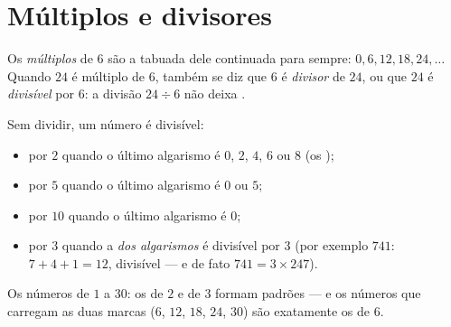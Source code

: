\section{Múltiplos e divisores}

\begin{definition}\label{def:g5:division:multiple}
Os \emph{múltiplos} de $6$ são a tabuada dele
continuada para sempre: $0, 6, 12, 18, 24, \dots$ Quando $24$ é
múltiplo de $6$, também se diz que $6$ é \emph{divisor}
de $24$, ou que $24$ é \emph{divisível} por $6$: a divisão
$24 \div 6$ não deixa .
\end{definition}

\begin{proposition}\label{prop:g5:division:criteria}
Sem dividir, um número é divisível:
\begin{itemize}
  \item por $2$ quando o último algarismo é $0$, $2$, $4$, $6$ ou $8$
        (os );
  \item por $5$ quando o último algarismo é $0$ ou $5$;
  \item por $10$ quando o último algarismo é $0$;
  \item por $3$ quando a \emph{ dos algarismos} é divisível por
        $3$ (por exemplo $741$: $7 + 4 + 1 = 12$, divisível --- e de
        fato $741 = 3 \times 247$).
\end{itemize}
\end{proposition}
\admitted

\begin{omfigure}

{\small Os números de $1$ a $30$: os  de $2$ e de $3$ formam
padrões --- e os números que carregam as duas marcas ($6$, $12$,
$18$, $24$, $30$) são exatamente os  de $6$.}
\end{omfigure}

